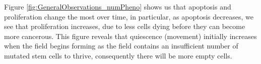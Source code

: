 \documentclass[\main/thesis.tex]{subfiles}
\begin{document}
Figure \ref{fig:GeneralObservations_numPheno} shows us that apoptosis and proliferation change the most over time, in particular, as apoptosis decreases, we see that proliferation increases, due to less cells dying before they can become more cancerous. This figure reveals that quiescence (movement) initially increases when the field begins forming as the field contains an insufficient number of mutated stem cells to thrive, consequently there will be more empty cells. 
\end{document}
